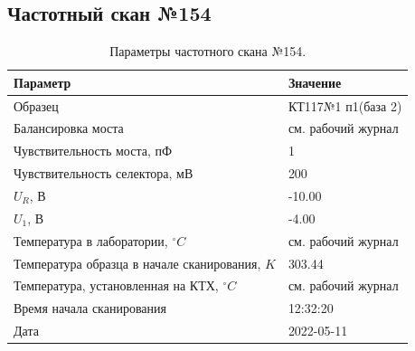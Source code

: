 \subsection{Частотный скан №154}
\begin{table}[!ht]
    \centering
    \caption{Параметры частотного скана №154.}
    \begin{tabular}{|l|l|}
        \hline
        Параметр                                       & Значение                  \\ \hline
        Образец                                        & КТ117№1 п1(база 2)        \\ \hline
        Балансировка моста                             & см. рабочий журнал        \\ \hline
        Чувствительность моста, пФ                     & 1                         \\ \hline
        Чувствительность селектора, мВ                 & 200                       \\ \hline
        $U_R$, В                                       & -10.00                    \\ \hline
        $U_1$, В                                       & -4.00                     \\ \hline
        Температура в лаборатории, $^\circ C$          & см. рабочий журнал        \\ \hline
        Температура образца в начале сканирования, $K$ & 303.44                    \\ \hline
        Температура, установленная на КТХ, $^\circ C$  & см. рабочий журнал        \\ \hline
        Время начала сканирования                      & 12:32:20                  \\ \hline
        Дата                                           & 2022-05-11                \\ \hline
    \end{tabular}
    \label{table:frequency_scan_154}
\end{table}

